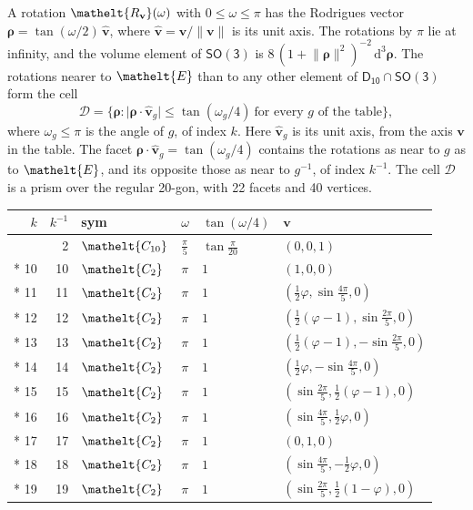 \documentclass[10pt,a4paper]{article}
\numberwithin{equation}{section}
\newcommand{\eltfont}[1]{{\let\sigma\eltsigma\mathelt{#1}}}
\newcommand{\grp}[1]{\mathsf{#1}}
\newcommand{\cls}[1]{\eltfont{#1}}
\newcommand{\elt}[1]{\eltfont{#1}}
\newcommand{\dirvec}[3]{(#1, #2, #3)}
\newcommand{\unitaxis}{\hat{\mathbf{v}}}
\newcommand{\vv}{\mathbf{v}}
\newcommand{\diff}{\mathrm{d}}
\newcommand{\goldenratio}{\varphi}
\newcommand{\rodrigues}{\boldsymbol{\rho}}
\newcommand{\fcell}{\mathcal{D}}
\begin{document}
\leavevmode\label{n:vector.rodrigues}\label{n:vector.unitaxis}A rotation $\elt{R_{\vv}}(\omega)$ with $0 \le \omega \le \pi$ has the Rodrigues vector $\rodrigues = \tan(\omega/2)\,\unitaxis$, where $\unitaxis = \vv/\lVert\vv\rVert$ is its unit axis. The rotations by $\pi$ lie at infinity, and the volume element of \href{SO3.pdf}{$\grp{SO(3)}$} is $8\,(1 + \lVert\rodrigues\rVert^2)^{-2}\,\diff^3\rodrigues$.
\leavevmode\label{n:set.cell}The rotations nearer to $\elt{E}$ than to any other element of $\grp{D_{10}} \cap \grp{SO(3)}$ form the cell
\begin{equation}\label{e:cell}\fcell = \bigl\{\rodrigues : \lvert\rodrigues\cdot\unitaxis_g\rvert \le \tan(\omega_g/4)\ \text{for every $g$ of the table}\bigr\},\end{equation}
where $\omega_g \le \pi$ is the angle of $g$, of index $k$. Here $\unitaxis_g$ is its unit axis, from the axis $\vv$ in the table. The facet $\rodrigues\cdot\unitaxis_g = \tan(\omega_g/4)$ contains the rotations as near to $g$ as to $\elt{E}$, and its opposite those as near to $g^{-1}$, of index $k^{-1}$. The cell $\fcell$ is a prism over the regular 20-gon, with 22 facets and 40 vertices.
{\small{\renewcommand{\arraystretch}{1.3}\begin{longtable}{@{}rrllll@{}}\toprule
$k$ & $k^{-1}$ & sym & $\omega$ & $\tan(\omega/4)$ & $\vv$\\\midrule\endhead
\bottomrule\endfoot\endlastfoot
1 & 2 & $\cls{C_{10}}$ & $\tfrac{\pi}{5}$ & $\tan\tfrac{\pi}{20}$ & $\dirvec{0}{0}{1}$\\*
10 & 10 & $\cls{C_{2}}$ & $\pi$ & $1$ & $\dirvec{1}{0}{0}$\\*
11 & 11 & $\cls{C_{2}}$ & $\pi$ & $1$ & $\dirvec{\tfrac{1}{2}\goldenratio{}}{\sin\tfrac{4\pi}{5}}{0}$\\*
12 & 12 & $\cls{C_{2}}$ & $\pi$ & $1$ & $\dirvec{\tfrac{1}{2}(\goldenratio - 1)}{\sin\tfrac{2\pi}{5}}{0}$\\*
13 & 13 & $\cls{C_{2}}$ & $\pi$ & $1$ & $\dirvec{\tfrac{1}{2}(\goldenratio - 1)}{-\sin\tfrac{2\pi}{5}}{0}$\\*
14 & 14 & $\cls{C_{2}}$ & $\pi$ & $1$ & $\dirvec{\tfrac{1}{2}\goldenratio{}}{-\sin\tfrac{4\pi}{5}}{0}$\\*
15 & 15 & $\cls{C_{2}}$ & $\pi$ & $1$ & $\dirvec{\sin\tfrac{2\pi}{5}}{\tfrac{1}{2}(\goldenratio - 1)}{0}$\\*
16 & 16 & $\cls{C_{2}}$ & $\pi$ & $1$ & $\dirvec{\sin\tfrac{4\pi}{5}}{\tfrac{1}{2}\goldenratio{}}{0}$\\*
17 & 17 & $\cls{C_{2}}$ & $\pi$ & $1$ & $\dirvec{0}{1}{0}$\\*
18 & 18 & $\cls{C_{2}}$ & $\pi$ & $1$ & $\dirvec{\sin\tfrac{4\pi}{5}}{-\tfrac{1}{2}\goldenratio{}}{0}$\\*
19 & 19 & $\cls{C_{2}}$ & $\pi$ & $1$ & $\dirvec{\sin\tfrac{2\pi}{5}}{\tfrac{1}{2}(1 - \goldenratio)}{0}$\\
\bottomrule\end{longtable}}}
\end{document}
